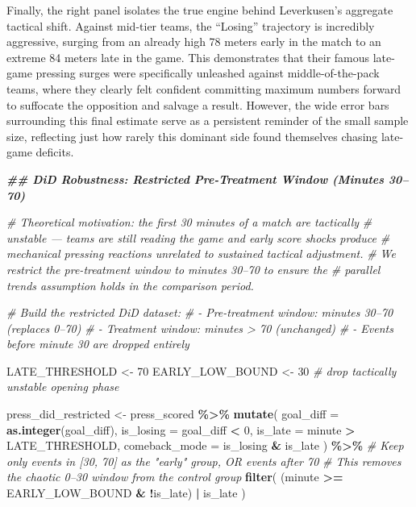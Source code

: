 \documentclass[
]{article}
\newenvironment{Shaded}{\begin{snugshade}}{\end{snugshade}}
\newcommand{\AttributeTok}[1]{\textcolor[rgb]{0.13,0.29,0.53}{#1}}
\newcommand{\CommentTok}[1]{\textcolor[rgb]{0.56,0.35,0.01}{\textit{#1}}}
\newcommand{\DecValTok}[1]{\textcolor[rgb]{0.00,0.00,0.81}{#1}}
\newcommand{\DocumentationTok}[1]{\textcolor[rgb]{0.56,0.35,0.01}{\textbf{\textit{#1}}}}
\newcommand{\FunctionTok}[1]{\textcolor[rgb]{0.13,0.29,0.53}{\textbf{#1}}}
\newcommand{\NormalTok}[1]{#1}
\newcommand{\OtherTok}[1]{\textcolor[rgb]{0.56,0.35,0.01}{#1}}
\newcommand{\SpecialCharTok}[1]{\textcolor[rgb]{0.81,0.36,0.00}{\textbf{#1}}}
\begin{document}
Finally, the right panel isolates the true engine behind Leverkusen's
aggregate tactical shift. Against mid-tier teams, the ``Losing''
trajectory is incredibly aggressive, surging from an already high 78
meters early in the match to an extreme 84 meters late in the game. This
demonstrates that their famous late-game pressing surges were
specifically unleashed against middle-of-the-pack teams, where they
clearly felt confident committing maximum numbers forward to suffocate
the opposition and salvage a result. However, the wide error bars
surrounding this final estimate serve as a persistent reminder of the
small sample size, reflecting just how rarely this dominant side found
themselves chasing late-game deficits.

\begin{Shaded}
\begin{Highlighting}[]
\DocumentationTok{\#\# DiD Robustness: Restricted Pre{-}Treatment Window (Minutes 30–70)}

\CommentTok{\# Theoretical motivation: the first 30 minutes of a match are tactically}
\CommentTok{\# unstable — teams are still reading the game and early score shocks produce}
\CommentTok{\# mechanical pressing reactions unrelated to sustained tactical adjustment.}
\CommentTok{\# We restrict the pre{-}treatment window to minutes 30–70 to ensure the}
\CommentTok{\# parallel trends assumption holds in the comparison period.}

\CommentTok{\# Build the restricted DiD dataset:}
\CommentTok{\#   {-} Pre{-}treatment window:  minutes 30–70  (replaces 0–70)}
\CommentTok{\#   {-} Treatment window:      minutes \textgreater{} 70   (unchanged)}
\CommentTok{\#   {-} Events before minute 30 are dropped entirely}

\NormalTok{LATE\_THRESHOLD   }\OtherTok{\textless{}{-}} \DecValTok{70}
\NormalTok{EARLY\_LOW\_BOUND  }\OtherTok{\textless{}{-}} \DecValTok{30}   \CommentTok{\# drop tactically unstable opening phase}

\NormalTok{press\_did\_restricted }\OtherTok{\textless{}{-}}\NormalTok{ press\_scored }\SpecialCharTok{\%\textgreater{}\%}
  \FunctionTok{mutate}\NormalTok{(}
    \AttributeTok{goal\_diff     =} \FunctionTok{as.integer}\NormalTok{(goal\_diff),}
    \AttributeTok{is\_losing     =}\NormalTok{ goal\_diff }\SpecialCharTok{\textless{}} \DecValTok{0}\NormalTok{,}
    \AttributeTok{is\_late       =}\NormalTok{ minute }\SpecialCharTok{\textgreater{}}\NormalTok{ LATE\_THRESHOLD,}
    \AttributeTok{comeback\_mode =}\NormalTok{ is\_losing }\SpecialCharTok{\&}\NormalTok{ is\_late}
\NormalTok{  ) }\SpecialCharTok{\%\textgreater{}\%}
  \CommentTok{\# Keep only events in [30, 70] as the "early" group, OR events after 70}
  \CommentTok{\# This removes the chaotic 0–30 window from the control group}
  \FunctionTok{filter}\NormalTok{(}
\NormalTok{    (minute }\SpecialCharTok{\textgreater{}=}\NormalTok{ EARLY\_LOW\_BOUND }\SpecialCharTok{\&} \SpecialCharTok{!}\NormalTok{is\_late) }\SpecialCharTok{|}\NormalTok{ is\_late}
\NormalTok{  )}


\end{Highlighting}
\end{Shaded}
\end{document}
